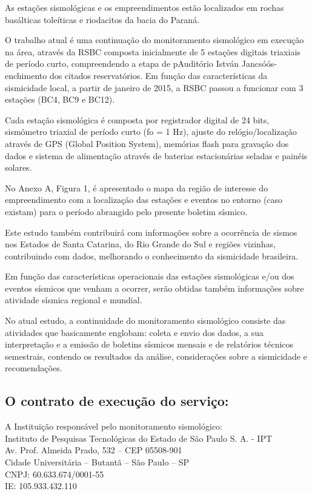 \par{As estações sismológicas e os empreendimentos estão localizados em rochas basálticas toleíticas e riodacitos da bacia do Paraná.}
\par{O trabalho atual é uma continuação do monitoramento sismológico em execução na área, através da RSBC composta inicialmente de 5 estações digitais triaxiais de período curto, compreendendo a etapa de pAuditório István Jancsóós-enchimento dos citados reservatórios. Em função das características da sismicidade local, a partir de janeiro de 2015, a RSBC passou a funcionar com 3 estações (BC4, BC9 e BC12).}
\par{Cada estação sismológica é composta por registrador digital de 24 bits, sismômetro triaxial de período curto (fo = 1 Hz), ajuste do relógio/localização através de GPS (Global Position System), memórias flash para gravação dos dados e sistema de alimentação através de baterias estacionárias seladas e painéis solares.}
\par{No Anexo A, Figura 1, é apresentado o mapa da região de interesse do empreendimento com a localização das estações e eventos no entorno (caso existam) para o período abrangido pelo presente boletim sísmico.}
\par{Este estudo também contribuirá com informações sobre a ocorrência de sismos nos Estados de Santa Catarina, do Rio Grande do Sul e regiões vizinhas, contribuindo com dados, melhorando o conhecimento da sismicidade brasileira.}
\par{Em função das características operacionais das estações sismológicas e/ou dos eventos sísmicos que venham a ocorrer, serão obtidas também informações sobre atividade sísmica regional e mundial.}
\par{No atual estudo, a continuidade do monitoramento sismológico consiste das atividades que basicamente englobam: coleta e envio dos dados, a sua interpretação e a emissão de boletins sísmicos mensais e de relatórios técnicos semestrais, contendo os resultados da análise, considerações sobre a sismicidade e recomendações.}

\subsection{O contrato de execução do serviço:}
\begin{small}
A Instituição responsável pelo monitoramento sismológico: \\
Instituto de Pesquisas Tecnológicas do Estado de São Paulo S. A. - IPT \\
Av. Prof. Almeida Prado, 532 – CEP 05508-901 \\
Cidade Universitária – Butantã – São Paulo – SP \\
CNPJ: 60.633.674/0001-55 \\
IE: 105.933.432.110 \\
\end{small}

